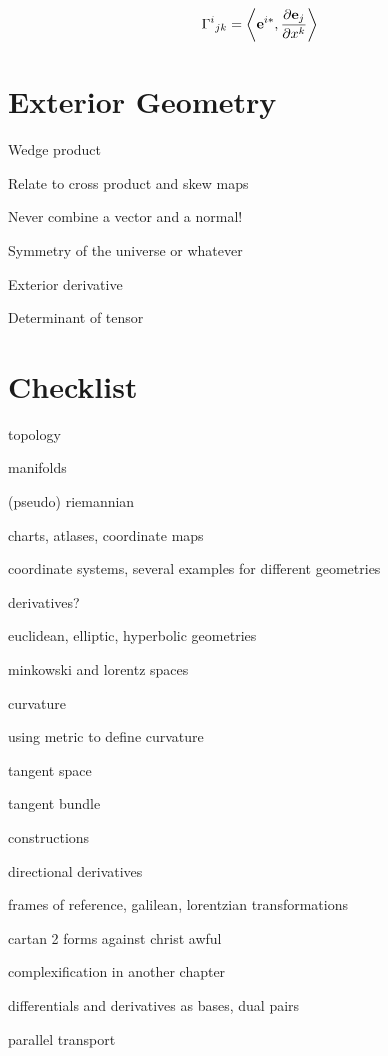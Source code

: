 \begin{align*}
	\Gamma^{i}{}_{jk} = \left\langle \vb{e}^{i*}, \pdv{\vb{e}_{j}}{x^{k}} \right\rangle
\end{align*}

\section{Exterior Geometry}

Wedge product

Relate to cross product and skew maps

Never combine a vector and a normal!

Symmetry of the universe or whatever

Exterior derivative

Determinant of tensor

\section{Checklist}

topology

manifolds

(pseudo) riemannian

charts, atlases, coordinate maps

coordinate systems, several examples for different geometries

derivatives?

euclidean, elliptic, hyperbolic geometries

minkowski and lorentz spaces

curvature

using metric to define curvature

tangent space

tangent bundle

constructions

directional derivatives

frames of reference, galilean, lorentzian transformations

cartan 2 forms against christ awful

complexification in another chapter

differentials and derivatives as bases, dual pairs

parallel transport